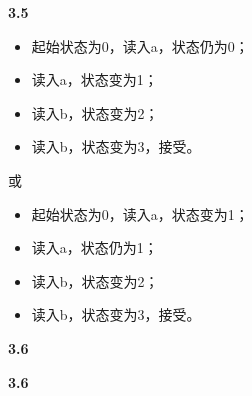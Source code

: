 \documentclass[UTF8]{report}
\newcommand{\tbf}[1]{\textbf{#1}}
\begin{document}
\noindent
\tbf{3.5}

\begin{itemize}
    \item 起始状态为0，读入a，状态仍为0；
    \item 读入a，状态变为1；
    \item 读入b，状态变为2；
    \item 读入b，状态变为3，接受。
\end{itemize}
或
\begin{itemize}
    \item 起始状态为0，读入a，状态变为1；
    \item 读入a，状态仍为1；
    \item 读入b，状态变为2；
    \item 读入b，状态变为3，接受。
\end{itemize}

\noindent
\tbf{3.6}

\noindent
\tbf{3.6}
\end{document}
